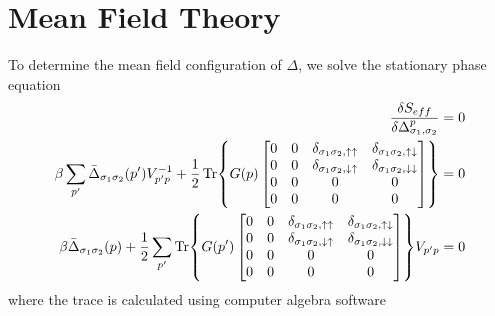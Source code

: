 \documentclass{article}
\begin{document}
\section{Mean Field Theory}
To determine the mean field configuration of $\Delta$, we solve the stationary phase equation
\begin{align}
    \frac{\delta S_{eff}}{\delta \Delta_{\sigma_1,\sigma_2}^{p}} &= 0 \\
    \beta\sum_{p'} \bar{\Delta}_{\sigma_1 \sigma_2}(p') V^{-1}_{p' p} + \frac{1}{2} \Tr{G(p) 
    \begin{bmatrix}
    0 & 0 & \delta_{\sigma_1 \sigma_2, \uparrow \uparrow} & \delta_{\sigma_1 \sigma_2, \uparrow \downarrow} \\
    0 & 0 & \delta_{\sigma_1 \sigma_2, \downarrow \uparrow} & \delta_{\sigma_1 \sigma_2, \downarrow \downarrow} \\ 
    0 & 0 & 0 & 0 \\ 
    0 & 0 & 0 & 0
    \end{bmatrix}} &=0 \\
    \beta \bar{\Delta}_{\sigma_1 \sigma_2}(p) + \frac{1}{2} \sum_{p'} \Tr{G(p') 
    \begin{bmatrix}
    0 & 0 & \delta_{\sigma_1 \sigma_2, \uparrow \uparrow} & \delta_{\sigma_1 \sigma_2, \uparrow \downarrow} \\
    0 & 0 & \delta_{\sigma_1 \sigma_2, \downarrow \uparrow} & \delta_{\sigma_1 \sigma_2, \downarrow \downarrow} \\ 
    0 & 0 & 0 & 0 \\ 
    0 & 0 & 0 & 0
    \end{bmatrix}} V_{p' p} &=0
\end{align}
where the trace is calculated using computer algebra software
\end{document}
